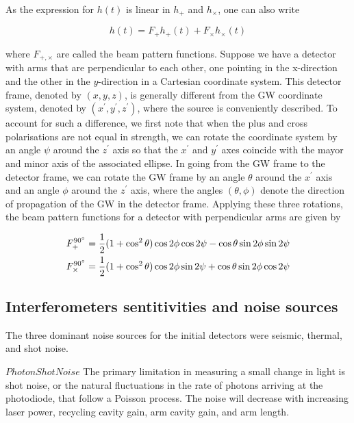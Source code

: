 \documentclass[binding=0.6cm, LaM]{sapthesis}
\begin{document}
	As the expression for $h(t)$ is linear in $h_{+}$ and $h_{\times}$, one can also write

		\begin{equation}
		h(t) = F_{+}h_{+} (t) + F_{\times}h_{\times}(t)
		\end{equation}

	where $F_{+,\times}$ are called the beam pattern functions. Suppose we have a detector 
	with arms that are perpendicular to each other, one pointing in the x-direction and the other
	in the $y$-direction in a Cartesian coordinate system. This detector frame, denoted by $(x,y,z)$, 
	is generally different from the GW coordinate system, denoted by $(x^\prime,y^\prime,z^\prime)$, where the source
	is conveniently described. To account for such a difference, we first note that when the plus 
	and cross polarisations are not equal in strength, we can rotate the coordinate system by
	an angle $\psi$ around the $z^\prime$ axis so that the $x^\prime$ and $y^\prime$ axes 
	coincide with the mayor and minor axis of the associated ellipse.
 	In going from the GW frame to the detector frame, we can rotate the GW frame by 
	an angle $\theta$ around the $x^\prime$ axis and an angle $\phi$ around the $z^\prime$ axis,
	where the angles $(\theta, \phi)$ denote the direction of propagation of the GW in the detector frame.
	Applying these three rotations, the beam pattern functions for a detector with perpendicular arms are given by

		\begin{align}
		F_{+}^{\ang{90}}& = {1 \over 2} (1 + \cos^2 \theta)\cos 2\phi \cos 2 \psi - \cos \theta \sin2\phi \sin2\psi \\
		F_{\times}^{\ang{90}}& = {1 \over 2} (1 + \cos^2 \theta)\cos 2\phi \sin 2 \psi + \cos \theta \sin2\phi \cos2\psi
		\end{align}

\subsection{Interferometers sentitivities and noise sources}

	The three dominant noise sources for the initial detectors were seismic, thermal, and shot noise.

	$Photon Shot Noise$
	The primary limitation in measuring a small change in light is shot noise,
	or the natural fluctuations in the rate of photons arriving at the photodiode, 
	that follow a Poisson process. The noise will decrease with increasing laser power, 
	recycling cavity gain, arm cavity gain, and arm length.
\end{document}
